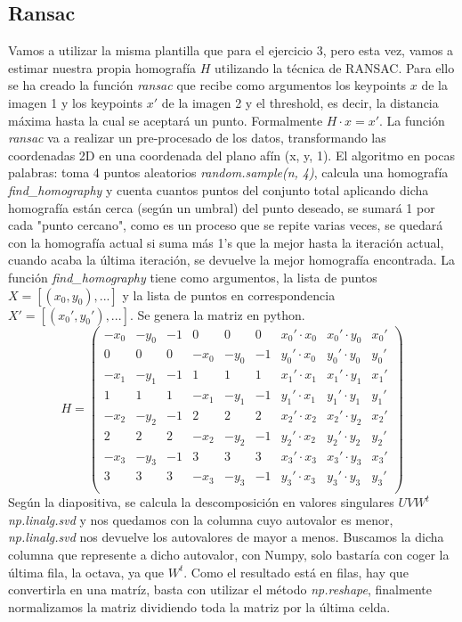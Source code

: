 \documentclass{article}
\begin{document}
\subsection{Ransac}
Vamos a utilizar la misma plantilla que para el ejercicio 3, pero esta vez, vamos a estimar nuestra propia homografía $H$ utilizando la técnica de RANSAC. Para ello se ha creado la función \textit{ransac} que recibe como argumentos los keypoints $x$ de la imagen 1 y los keypoints $x'$ de la imagen 2 y el threshold, es decir, la distancia máxima hasta la cual se aceptará un punto. Formalmente $H\cdot x=x'$. La función \textit{ransac} va a realizar un pre-procesado de los datos, transformando las coordenadas 2D en una coordenada del plano afín (x, y, 1). \newline
El algoritmo en pocas palabras: toma 4 puntos aleatorios \textit{random.sample(n, 4)}, calcula una homografía \textit{find\_homography} y cuenta cuantos puntos del conjunto total aplicando dicha homografía están cerca (según un umbral) del punto deseado, se sumará 1 por cada "punto cercano", como es un proceso que se repite varias veces, se quedará con la homografía actual si suma más 1's que la mejor hasta la iteración actual, cuando acaba la última iteración, se devuelve la mejor homografía encontrada.
\newline
La función \textit{find\_homography} tiene como argumentos, la lista de puntos $X = [(x_0, y_0),...]$ y la lista de puntos en correspondencia $X' = [(x_0', y_0'),...]$. Se genera la matriz  en python.
$$ H = 
\begin{pmatrix}
-x_0 & -y_0 & -1 & 0 & 0 & 0 & x_0' \cdot x_0 & x_0' \cdot y_0 & x_0'\\
0& 0& 0& -x_0& -y_0& -1& y_0' \cdot x_0& y_0' \cdot y_0& y_0' \\
-x_1 & -y_1 & -1 & 1 & 1 & 1 & x_1' \cdot x_1 & x_1' \cdot y_1 & x_1'\\
1& 1& 1& -x_1& -y_1& -1& y_1' \cdot x_1& y_1' \cdot y_1& y_1' \\
-x_2 & -y_2 & -1 & 2 & 2 & 2 & x_2' \cdot x_2 & x_2' \cdot y_2 & x_2'\\
2& 2& 2& -x_2& -y_2& -1& y_2' \cdot x_2& y_2' \cdot y_2& y_2' \\
-x_3 & -y_3 & -1 & 3 & 3 & 3 & x_3' \cdot x_3 & x_3' \cdot y_3 & x_3'\\
3& 3& 3& -x_3& -y_3& -1& y_3' \cdot x_3& y_3' \cdot y_3& y_3' \\
\end{pmatrix}$$
Según la diapositiva, se calcula la descomposición en valores singulares $UVW^t$ \textit{np.linalg.svd} y nos quedamos con la columna cuyo autovalor es menor, \textit{np.linalg.svd} nos devuelve los autovalores de mayor a menos. Buscamos la dicha columna que represente a dicho autovalor, con Numpy, solo  bastaría con coger la última fila, la octava, ya que $W^t$. Como el resultado está en filas, hay que convertirla en una matríz, basta con utilizar el método \textit{np.reshape}, finalmente normalizamos la matriz dividiendo toda la matriz por la última celda. 
\end{document}
